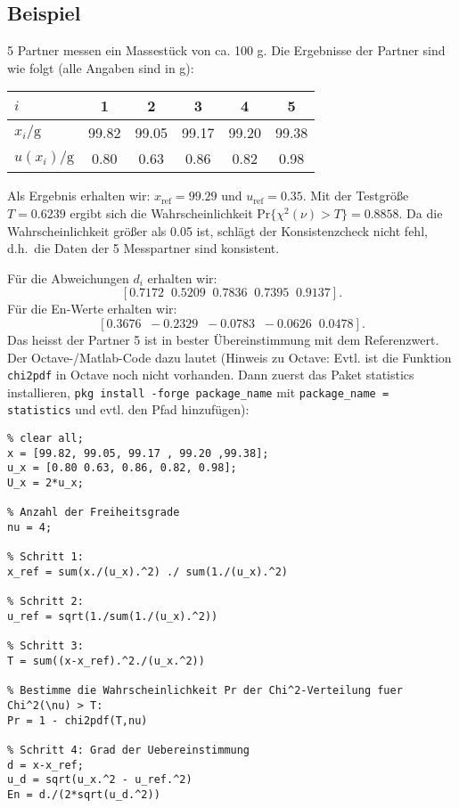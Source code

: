 \subsection{Beispiel}
\label{Beispielringvergleich1}
5 Partner messen ein Massestück von ca. 100 g. Die Ergebnisse
der Partner sind wie folgt (alle Angaben sind in g):
\begin{center}
\begin{tabular}{l | c c c c c}
$i$	& 1 & 2 & 3 & 4 & 5 \\	\hline
$x_i / \mathrm{g}$ & 99.82 &  99.05 & 99.17 & 99.20 & 99.38  \\ \hline
$u(x_i) / \mathrm{g}$ & 0.80 & 0.63 & 0.86 & 0.82 & 0.98
\end{tabular}
\end{center}
Als Ergebnis erhalten wir: $x_\mathrm{ref} = 99.29$ und $u_\mathrm{ref} = 0.35$.
Mit der Testgröße $T=0.6239$ ergibt sich die Wahrscheinlichkeit
$\mathrm{Pr}\{\chi^2(\nu) > T\} = 0.8858$. Da die Wahrscheinlichkeit größer als 0.05 ist, schlägt der
Konsistenzcheck nicht fehl,
d.h.\ die Daten der 5 Messpartner sind konsistent.

Für die Abweichungen $d_i$ erhalten wir:
$$
[0.7172 \;\;   0.5209 \;\;   0.7836  \;\;  0.7395 \;\;   0.9137].
$$
Für die En-Werte erhalten wir:
$$
[ 0.3676 \;\;  -0.2329 \;\;  -0.0783 \;\;  -0.0626 \;\;   0.0478].
$$
Das heisst der Partner 5 ist in bester Übereinstimmung mit dem Referenzwert. \\
Der Octave-/Matlab-Code dazu lautet (Hinweis zu Octave: Evtl. ist die Funktion
\texttt{chi2pdf} in Octave noch nicht vorhanden. Dann zuerst das Paket statistics
installieren, \texttt{pkg install -forge package\_name} mit
\texttt{package\_name = statistics} und evtl. den Pfad hinzufügen): \\
\begin{lstlisting}[style=Matlab]
% addpath('C:\Octave\Octave-4.2.1\share\octave\packages');
% clear all;
x = [99.82, 99.05, 99.17 , 99.20 ,99.38];
u_x = [0.80 0.63, 0.86, 0.82, 0.98];
U_x = 2*u_x;

% Anzahl der Freiheitsgrade
nu = 4;

% Schritt 1:
x_ref = sum(x./(u_x).^2) ./ sum(1./(u_x).^2)

% Schritt 2:
u_ref = sqrt(1./sum(1./(u_x).^2))

% Schritt 3:
T = sum((x-x_ref).^2./(u_x.^2))

% Bestimme die Wahrscheinlichkeit Pr der Chi^2-Verteilung fuer Chi^2(\nu) > T:
Pr = 1 - chi2pdf(T,nu)

% Schritt 4: Grad der Uebereinstimmung
d = x-x_ref;
u_d = sqrt(u_x.^2 - u_ref.^2)
En = d./(2*sqrt(u_d.^2))
\end{lstlisting}

